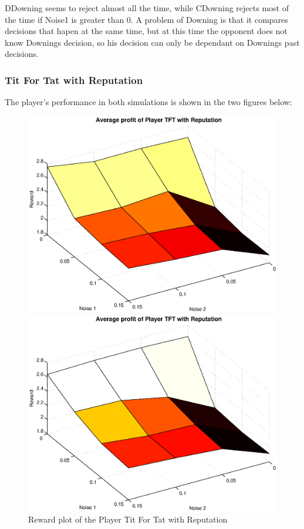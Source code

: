 \documentclass[11pt,twoside]{article}
\begin{document}
DDowning seems to reject almost all the time, while CDowning rejects most of the time if Noise1 is greater than 0. A problem of Downing is that it compares decisions that hapen at the same time, but at this time the opponent does not know Downings decision, so his decision can only be dependant on Downings past decisions.

\newpage
\subsubsection{Tit For Tat with Reputation}
The player's performance in both simulations is shown in the two figures below:
\begin{figure}[h]

\begin{minipage}[hbt]{0.65\textwidth}
	\centering
	\includegraphics[width=\textwidth]{pics/simulation1/Reward_vs_Noise_of_Player_TFT_with_Reputation}
\end{minipage}
\hfill
\begin{minipage}[hbt]{0.3\textwidth}
	\centering
	\includegraphics[width=\textwidth]{pics/simulation2/Reward_vs_Noise_of_Player_TFT_with_Reputation}
\end{minipage}
	\caption{Reward plot of the Player Tit For Tat with Reputation}
	\label{pic player tftwr}
\end{figure}
\end{document}
